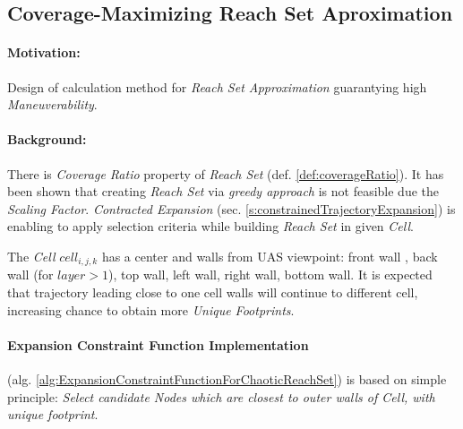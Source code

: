 \subsection{Coverage-Maximizing Reach Set Aproximation}\label{s:chaoticReachSet}

\paragraph{Motivation:} Design of calculation method for \emph{Reach Set Approximation} guarantying high \emph{Maneuverability}.

\paragraph{Background:}There is \emph{Coverage Ratio} property of \emph{Reach Set} (def. \ref{def:coverageRatio}). It has been shown that creating \emph{Reach Set} via \emph{greedy approach} is not feasible due the \emph{Scaling Factor}.  \emph{Contracted Expansion} (sec. \ref{s:constrainedTrajectoryExpansion}) is enabling to apply selection criteria while building \emph{Reach Set} in given \emph{Cell}. 

The \emph{Cell} $cell_{i,j,k}$ has a center and walls from UAS viewpoint: front wall , back wall (for $layer > 1$), top wall, left wall, right wall, bottom wall. It is expected that trajectory leading close to one cell walls will continue to different cell, increasing chance to obtain more \emph{Unique Footprints}. 

\paragraph{Expansion Constraint Function Implementation} (alg. \ref{alg:ExpansionConstraintFunctionForChaoticReachSet}) is based on simple principle: \emph{Select candidate Nodes which are  closest to outer walls of Cell, with unique footprint}.

